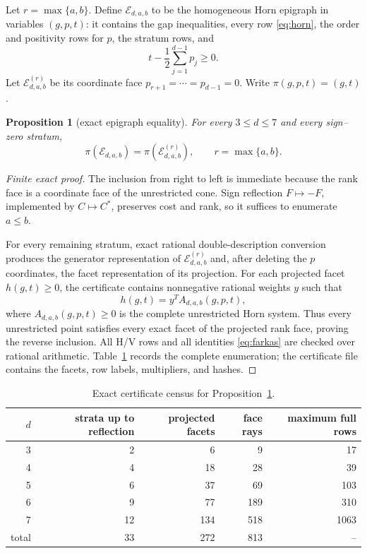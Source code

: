 \documentclass[11pt]{article}
\newtheorem{proposition}[theorem]{Proposition}
\begin{document}
Let $r=\max\{a,b\}$.  Define $\mathcal E_{d,a,b}$ to be the homogeneous Horn
epigraph in variables $(g,p,t)$: it contains the gap inequalities, every row
\eqref{eq:horn}, the order and positivity rows for $p$, the stratum rows, and
\[
 t-\frac12\sum_{j=1}^{d-1}p_j\ge0.
\]
Let $\mathcal E^{(r)}_{d,a,b}$ be its coordinate face
$p_{r+1}=\cdots=p_{d-1}=0$.  Write $\pi(g,p,t)=(g,t)$.

\begin{proposition}[exact epigraph equality]\label{prop:projection}
For every $3\le d\le7$ and every sign--zero stratum,
\begin{equation}
 \pi(\mathcal E_{d,a,b})=\pi(\mathcal E^{(r)}_{d,a,b}),
 \qquad r=\max\{a,b\}.
 \label{eq:projection}
\end{equation}
\end{proposition}

\begin{proof}[Finite exact proof]
The inclusion from right to left is immediate because the rank face is a
coordinate face of the unrestricted cone.  Sign reflection $F\mapsto-F$,
implemented by $C\mapsto C^*$, preserves cost and rank, so it suffices to
enumerate $a\le b$.

For every remaining stratum, exact rational double-description conversion
produces the generator representation of $\mathcal E^{(r)}_{d,a,b}$ and,
after deleting the $p$ coordinates, the facet representation of its
projection.  For each projected facet $h(g,t)\ge0$, the certificate contains
nonnegative rational weights $y$ such that
\begin{equation}
 h(g,t)=y^T A_{d,a,b}(g,p,t),
 \label{eq:farkas}
\end{equation}
where $A_{d,a,b}(g,p,t)\ge0$ is the complete unrestricted Horn system.
Thus every unrestricted point satisfies every exact facet of the projected
rank face, proving the reverse inclusion.  All H/V rows and all identities
\eqref{eq:farkas} are checked over rational arithmetic.  Table~\ref{tab:cert}
records the complete enumeration; the certificate file contains the facets,
row labels, multipliers, and hashes.
\end{proof}

\begin{table}[t]
\centering
\caption{Exact certificate census for Proposition~\ref{prop:projection}.}
\label{tab:cert}
\begin{tabular}{@{}rrrrr@{}}
\toprule
$d$ & strata up to reflection & projected facets & face rays & maximum full rows\\
\midrule
3 & 2  & 6   & 9   & 17\\
4 & 4  & 18  & 28  & 39\\
5 & 6  & 37  & 69  & 103\\
6 & 9  & 77  & 189 & 310\\
7 & 12 & 134 & 518 & 1063\\
\midrule
total & 33 & 272 & 813 & --\\
\bottomrule
\end{tabular}
\end{table}
\end{document}
